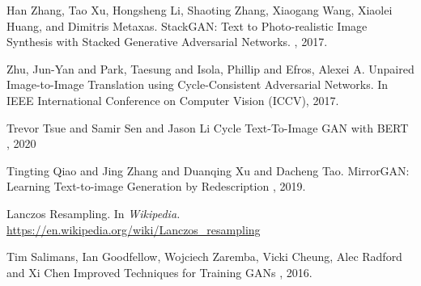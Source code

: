 \documentclass{article}
\begin{document}
	  
	\begin{thebibliography}{1}
		Han Zhang, Tao Xu, Hongsheng Li, Shaoting Zhang, Xiaogang Wang, Xiaolei Huang, and 
		Dimitris Metaxas.
		\newblock StackGAN: Text to Photo-realistic Image Synthesis with Stacked 
		Generative Adversarial Networks.
		, 2017.
		

		Zhu, Jun-Yan and Park, Taesung and Isola, Phillip and Efros, Alexei A.
		\newblock Unpaired Image-to-Image Translation using Cycle-Consistent Adversarial Networks.
		\newblock In IEEE International Conference on Computer Vision (ICCV), 2017.

		Trevor Tsue and Samir Sen and Jason Li
		\newblock Cycle Text-To-Image GAN with BERT
		, 2020
		
		Tingting Qiao and Jing Zhang and Duanqing Xu and Dacheng Tao.
		\newblock MirrorGAN: Learning Text-to-image Generation by Redescription
		, 2019.

		Lanczos Resampling.
		\newblock In {\em Wikipedia.} \url{https://en.wikipedia.org/wiki/Lanczos_resampling}
		
		Tim Salimans, Ian Goodfellow, Wojciech Zaremba, Vicki Cheung, Alec Radford and Xi Chen
		\newblock Improved Techniques for Training GANs
		, 2016.

	\end{thebibliography}
	
\end{document}
